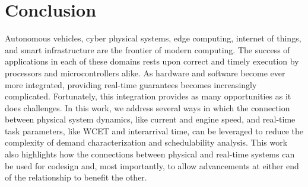 \section{Conclusion}   \label{chap:conclusion}

Autonomous vehicles, cyber physical systems, edge computing, internet of things, and smart infrastructure are the frontier of modern computing.
The success of applications in each of these domains rests upon correct and timely execution by processors and microcontrollers alike.
As hardware and software become ever more integrated, providing real-time guarantees becomes increasingly complicated.
Fortunately, this integration provides as many opportunities as it does challenges.
In this work, we address several ways in which the connection between physical system dynamics, like current and engine speed, and real-time task parameters, like WCET and interarrival time, can be leveraged to reduce the complexity of demand characterization and schedulability analysis.
This work also highlights how the connections between physical and real-time systems can be used for codesign and, most importantly, to allow advancements at either end of the relationship to benefit the other.